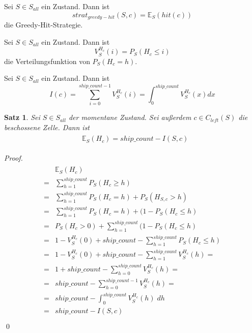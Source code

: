 \documentclass[a4paper,12pt]{llncs}
\numberwithin{equation}{section}
\newtheorem{satz}{Satz}
\begin{document}
\begin{definition}
Sei $S\in S_{all}$ ein Zustand.
Dann ist
\[
strat_{greedy-hit}(S,c)=\mathds{E}_S(hit(c))
\]
die Greedy-Hit-Strategie.
\end{definition}

\begin{definition}
Sei $S\in S_{all}$ ein Zustand.
Dann ist
\[
V_S^{H_{c}}(i)=P_S(H_{c} \leq i)
\]
die Verteilungsfunktion von $P_S(H_{c}=h)$.
\end{definition}

\begin{definition}
Sei $S\in S_{all}$ ein Zustand.
Dann ist
\[
I(c)=\sum_{i=0}^{ship\_count - 1} V_S^{H_{c}}(i)=\int_{0}^{ship\_count} V_S^{H_{c}}(x) dx
\]
\end{definition}

\begin{satz}
Sei $S\in S_{all}$ der momentane Zustand.
Sei außerdem $c \in C_{left}(S)$ die beschossene Zelle.
Dann ist
\begin{align}
\begin{split}
&\mathds{E}_S(H_c)=ship\_count - I(S,c)
\end{split}
\end{align}
\end{satz}

\begin{proof}
\begin{align}
\begin{split}
&\mathds{E}_S(H_{c})\\
=&\sum_{h=1}^{ship\_count} P_S(H_{c} \geq h)\\
=&\sum_{h=1}^{ship\_count} P_S(H_{c}=h) + P_S(H_{S,c} > h)\\
=&\sum_{h=1}^{ship\_count} P_S(H_{c}=h) + (1 - P_S(H_{c} \leq h)\\
=&P_S(H_{c} > 0) + \sum_{h=1}^{ship\_count} (1 - P_S(H_{c} \leq h)\\
=&1 - V_S^{H_{c}}(0) + ship\_count - \sum_{h=1}^{ship\_count} P_S(H_{c} \leq h)\\
=&1 - V_S^{H_{c}}(0) + ship\_count - \sum_{h=1}^{ship\_count} V_S^{H_{c}}(h)=\\
=&1 + ship\_count - \sum_{h=0}^{ship\_count} V_S^{H_{c}}(h)=\\
=&ship\_count - \sum_{h=0}^{ship\_count - 1} V_S^{H_{c}}(h)=\\
=&ship\_count - \int_{0}^{ship\_count} V_S^{H_{c}}(h) \; dh\\
=&ship\_count - I(S,c)\\
\end{split}
\end{align}
\qed
\end{proof}
\end{document}
